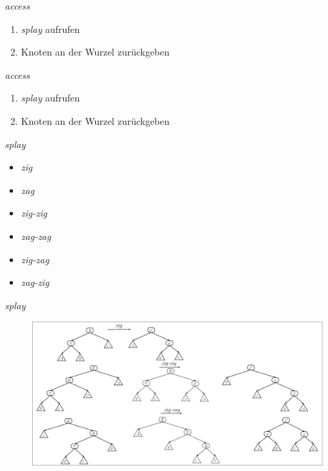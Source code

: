 \documentclass[11pt]{beamer}
\begin{document}
\begin{frame} {\textit{access}}
	\begin{enumerate}
		\item  \textit{splay} aufrufen
		\item Knoten an der Wurzel zurückgeben
	\end{enumerate}
\end{frame}

\begin{frame} {\textit{access}}
	\begin{enumerate}
		\item  \textit{splay} aufrufen
		\item Knoten an der Wurzel zurückgeben
	\end{enumerate}
\end{frame}
\begin{frame} {\textit{splay}}
	\begin{itemize}
		\item  \textit{zig}
		\item  \textit{zag}
		\item  \textit{zig-zig}
		\item  \textit{zag-zag}
		\item  \textit{zig-zag}
		\item  \textit{zag-zig}
	\end{itemize}
\end{frame}


\begin{frame}{\textit{splay}}
		\begin{figure}[H]
		\centering
		\includegraphics[width=1\textwidth]{"Medien/pres/zigzag"}
	\end{figure}
\end{frame}
\end{document}
